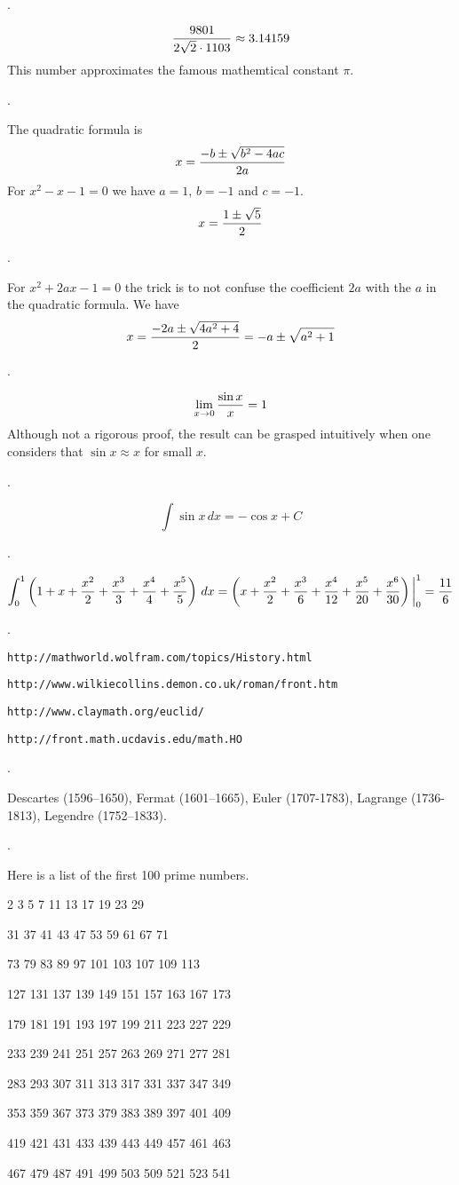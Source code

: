 .

$${9801\over2\sqrt2\cdot1103}\approx3.14159$$
This number approximates the famous mathemtical constant $\pi$.

.

The quadratic formula is
$$x={-b\pm\sqrt{b^2-4ac}\over2a}$$
For $x^2-x-1=0$ we have $a=1$, $b=-1$ and $c=-1$.
$$x={1\pm\sqrt5\over2}$$

.

For $x^2+2ax-1=0$ the trick is to not confuse the coefficient $2a$ with the
$a$ in the quadratic formula. We have
$$x={-2a\pm\sqrt{4a^2+4}\over2}=-a\pm\sqrt{a^2+1}$$

.

$$\lim_{x\to0}{\sin x\over x}=1$$
Although not a rigorous proof, the result can be grasped intuitively
when one considers that $\sin x\approx x$ for small $x$.

.

$$\int \sin x\,dx=-\cos x+C$$

.

$$\int_0^1\left(1+x+{x^2\over2}+{x^3\over3}+{x^4\over4}+{x^5\over5}\right)\,dx
=\left(x+{x^2\over2}+{x^3\over6}+{x^4\over12}+{x^5\over20}+{x^6\over30}\right)
\bigg|_0^1={11\over6}$$

.

\par
{\tt http://mathworld.wolfram.com/topics/History.html}\par
{\tt http://www.wilkiecollins.demon.co.uk/roman/front.htm}\par
{\tt http://www.claymath.org/euclid/}\par
{\tt http://front.math.ucdavis.edu/math.HO}

.

Descartes (1596--1650),
Fermat (1601--1665), Euler (1707-1783), Lagrange (1736-1813),
Legendre (1752--1833).

.

Here is a list of the first 100 prime numbers.\par
  2   3   5   7  11  13  17  19  23  29\par
 31  37  41  43  47  53  59  61  67  71\par
 73  79  83  89  97 101 103 107 109 113\par
127 131 137 139 149 151 157 163 167 173\par
179 181 191 193 197 199 211 223 227 229\par
233 239 241 251 257 263 269 271 277 281\par
283 293 307 311 313 317 331 337 347 349\par
353 359 367 373 379 383 389 397 401 409\par
419 421 431 433 439 443 449 457 461 463\par
467 479 487 491 499 503 509 521 523 541\par


